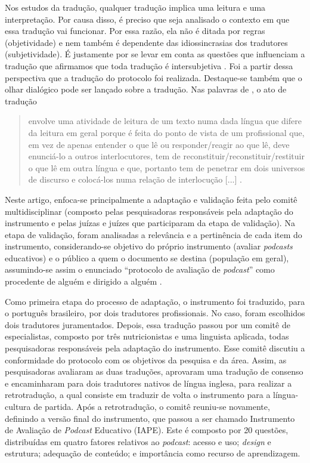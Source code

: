 Nos estudos da tradução, qualquer tradução implica uma leitura e uma interpretação. Por causa disso, é preciso que seja analisado o contexto em que essa tradução vai funcionar. Por essa razão, ela não é ditada por regras (objetividade) e nem também é dependente das idiossincrasias dos tradutores (subjetividade). É justamente por se levar em conta as questões que influenciam a tradução que afirmamos que toda tradução é intersubjetiva \cite{toury1995}. Foi a partir dessa perspectiva que a tradução do protocolo foi realizada. Destaque-se também que o olhar dialógico pode ser lançado sobre a tradução. Nas palavras de \textcite{sobral2008}, o ato de tradução 
\begin{quote}
envolve uma atividade de leitura de um texto numa dada língua que difere da leitura em geral porque é feita do ponto de vista de um profissional que, em vez de apenas entender o que lê ou responder/reagir ao que lê, deve enunciá-lo a outros interlocutores, tem de reconstituir/reconstituir/restituir o que lê em outra língua e que, portanto tem de penetrar em dois universos de discurso e colocá-los numa relação de interlocução [...] \cite[p. 7–8]{sobral2008}. 
\end{quote}

Neste artigo, enfoca-se principalmente a adaptação e validação feita pelo comitê multidisciplinar (composto pelas pesquisadoras responsáveis pela adaptação do instrumento e pelas juízas e juízes que participaram da etapa de validação). Na etapa de validação, foram analisadas a relevância e a pertinência de cada item do instrumento, considerando-se objetivo do próprio instrumento (avaliar \textit{podcasts} educativos) e o público a quem o documento se destina (população em geral), assumindo-se assim o enunciado \enquote{protocolo de avaliação de \textit{podcast}} como procedente de alguém e dirigido a alguém \cite{volochinov2013}.

Como primeira etapa do processo de adaptação, o instrumento foi traduzido, para o português brasileiro, por dois tradutores profissionais. No caso, foram escolhidos dois tradutores juramentados. Depois, essa tradução passou por um comitê de especialistas, composto por três nutricionistas e uma linguista aplicada, todas pesquisadoras responsáveis pela adaptação do instrumento. Esse comitê discutiu a conformidade do protocolo com os objetivos da pesquisa e da área. Assim, as pesquisadoras avaliaram as duas traduções, aprovaram uma tradução de consenso e encaminharam para dois tradutores nativos de língua inglesa, para realizar a retrotradução, a qual consiste em traduzir de volta o instrumento para a língua-cultura de partida. Após a retrotradução, o comitê reuniu-se novamente, definindo a versão final do instrumento, que passou a ser chamado Instrumento de Avaliação de \textit{Podcast} Educativo (IAPE). Este é composto por 20 questões, distribuídas em quatro fatores relativos ao \textit{podcast}: acesso e uso; \textit{design} e estrutura; adequação de conteúdo; e importância como recurso de aprendizagem.

